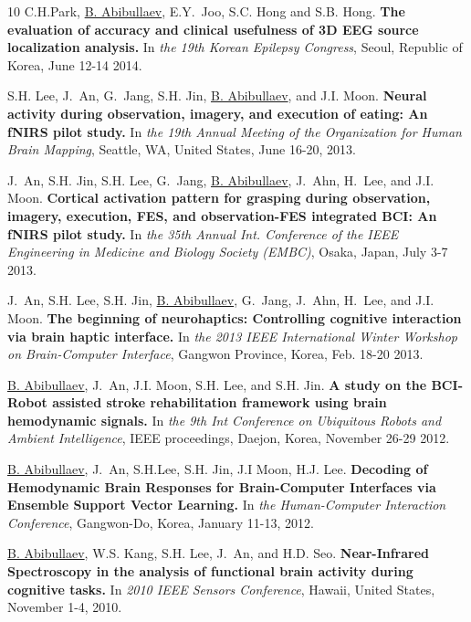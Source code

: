 \documentclass[10pt,letterpaper,sans]{moderncv}   %
\begin{document}
\begin{thebibliography}{10}
C.H.Park,  \underline{B. Abibullaev}, E.Y.~Joo, S.C. Hong and S.B. Hong.
\newblock \textbf{The evaluation of accuracy and clinical usefulness of 3D {EEG} source localization analysis.}
\newblock In {\em the 19th Korean Epilepsy Congress}, Seoul, Republic of Korea, June 12-14 2014.

S.H. Lee, J.~An, G.~Jang, S.H. Jin, \underline{B. Abibullaev}, and J.I. Moon.
\newblock \textbf{Neural activity during observation, imagery, and execution of eating: An {fNIRS} pilot study.}
\newblock In {\em the 19th Annual Meeting of the Organization for Human Brain
  Mapping}, Seattle, WA, United States, June 16-20, 2013.

J.~An, S.H. Jin, S.H. Lee, G.~Jang, \underline{B. Abibullaev}, J.~Ahn, H.~Lee, and J.I. Moon.
\newblock \textbf{Cortical activation pattern for grasping during observation, imagery, execution, {FES}, and observation-{FES} integrated {BCI}: An {fNIRS} pilot study.}
\newblock In {\em the 35th Annual Int. Conference of the {IEEE} Engineering in Medicine and Biology Society (EMBC)}, Osaka, Japan, July 3-7 2013.

J.~An, S.H. Lee, S.H. Jin, \underline{B. Abibullaev}, G.~Jang, J.~Ahn, H.~Lee,  and J.I. Moon.
\newblock \textbf{The beginning of neurohaptics: Controlling cognitive interaction via brain haptic interface.}
\newblock In {\em the 2013 IEEE International Winter Workshop on Brain-Computer Interface}, Gangwon Province, Korea, Feb. 18-20 2013.

\underline{B. Abibullaev}, J.~An, J.I. Moon, S.H. Lee, and S.H. Jin.
\newblock \textbf{A study on the {BCI}-{Robot} assisted stroke rehabilitation framework using brain hemodynamic signals.}
\newblock In {\em the 9th Int Conference on Ubiquitous Robots and Ambient Intelligence}, IEEE proceedings, Daejon, Korea, November 26-29 2012.

\underline{B. Abibullaev}, J.~An, S.H.Lee, S.H. Jin, J.I Moon, H.J. Lee.
\newblock \textbf{Decoding of Hemodynamic Brain Responses for Brain-Computer Interfaces via Ensemble Support Vector Learning.}
\newblock In {\em the Human-Computer Interaction Conference}, Gangwon-Do, Korea, January 11-13, 2012.

\underline{B. Abibullaev}, W.S. Kang, S.H. Lee, J.~An, and H.D. Seo.
\newblock \textbf{Near-Infrared Spectroscopy in the analysis of functional brain activity during cognitive tasks.}
\newblock In {\em 2010 IEEE Sensors Conference}, Hawaii, United States, November 1-4, 2010.


\end{thebibliography}
\end{document}
